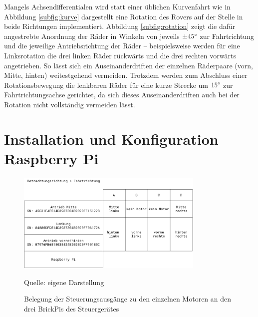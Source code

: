 Mangels Achsendifferentialen wird statt einer üblichen Kurvenfahrt wie in Abbildung \ref{subfig:kurve} dargestellt eine Rotation des Rovers auf der Stelle in beide Richtungen implementiert.
Abbildung \ref{subfig:rotation} zeigt die dafür angestrebte Anordnung der Räder in Winkeln von jeweils $\pm45\degree$ zur Fahrtrichtung und die jeweilige Antriebsrichtung der Räder -- beispielsweise werden für eine Linksrotation die drei linken Räder rückwärts und die drei rechten vorwärts angetrieben.
So lässt sich ein Auseinanderdriften der einzelnen Räderpaare (vorn, Mitte, hinten) weitestgehend vermeiden.
Trotzdem werden zum Abschluss einer Rotationsbewegung die lenkbaren Räder für eine kurze Strecke um $15\degree$ zur Fahrtrichtungsachse gerichtet, da sich dieses Auseinanderdriften auch bei der Rotation nicht vollständig vermeiden lässt.

\section{Installation und Konfiguration Raspberry Pi}
\label{sec:inst_konf_raspi}

\begin{figure}
	\centering
	\includegraphics[width=0.8\textwidth]{../Images/brickpiconfig.pdf}
	\vspace{0.5em}
	\parbox[c]{0.8\linewidth}{\footnotesize
		\centering
		\vspace{1em}
		Quelle: eigene Darstellung
	}
	\caption{Belegung der Steuerungsausgänge zu den einzelnen Motoren an den drei BrickPis des Steuergerätes}
	\label{fig:brickpistack}
\end{figure}

